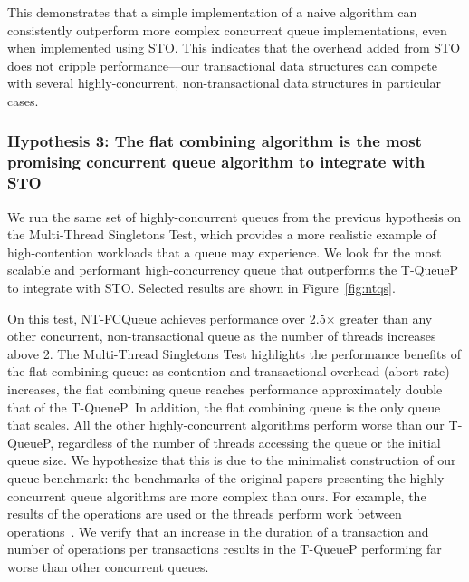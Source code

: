This demonstrates that a simple implementation of a naive algorithm can consistently outperform more complex concurrent queue implementations, even when implemented using STO. This indicates that the overhead added from STO does not cripple performance---our transactional data structures can compete with several highly-concurrent, non-transactional data structures in particular cases. 

\vspace{12pt}
\noindent{}

\subsubsection{Hypothesis 3: The flat combining algorithm is the most promising concurrent queue algorithm to integrate with STO}
\label{eval:hypo3}

We run the same set of highly-concurrent queues from the previous hypothesis on the Multi-Thread Singletons Test, which provides a more realistic example of high-contention workloads that a queue may experience. We look for the most scalable and performant high-concurrency queue that outperforms the T-QueueP to integrate with STO. Selected results are shown in Figure~\ref{fig:ntqs}.

On this test, NT-FCQueue achieves performance over 2.5$\times$ greater than any other concurrent, non-transactional queue as the number of threads increases above 2. The Multi-Thread Singletons Test highlights the performance benefits of the flat combining queue: as contention and transactional overhead (abort rate) increases, the flat combining queue reaches performance approximately double that of the T-QueueP. In addition, the flat combining queue is the only queue that scales. All the other highly-concurrent algorithms perform worse than our T-QueueP, regardless of the number of threads accessing the queue or the initial queue size. We hypothesize that this is due to the minimalist construction of our queue benchmark: the benchmarks of the original papers presenting the highly-concurrent queue algorithms are more complex than ours. For example, the results of the operations are used or the threads perform work between operations~\cite{queue1}. We verify that an increase in the duration of a transaction and number of operations per transactions results in the T-QueueP performing far worse than other concurrent queues.


